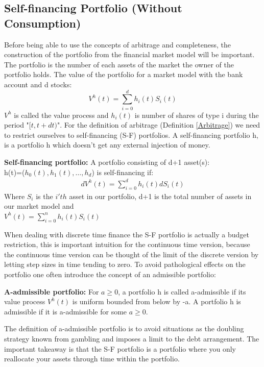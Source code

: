 \subsection{Self-financing Portfolio (Without Consumption)}
Before being able to use the concepts of arbitrage and completeness, the construction of the portfolio from the financial market model will be important. The portfolio is the number of each assets of the market the owner of the portfolio holds. The value of the portfolio for a market model with the bank account and d stocks:
\begin{equation*}
V^h(t)=\sum_{i=0}^{d} h_{i}(t) S_i(t)
\end{equation*}
$V^h$ is called the value process and $h_i(t)$ is number of shares of type i during the period "$[t,t+dt)$". For the definition of arbitrage (Definition \ref{Arbitrage}) we need to restrict ourselves to self-financing (S-F) portfolios. A self-financing portfolio h, is a portfolio h which doesn't get any external injection of money.
\theoremstyle{definition}
\begin{definition}{\textbf{Self-financing portfolio: }}
A portfolio consisting of d+1 asset(s): \\
h(t)=($h_0(t),h_1(t), \dotsc, h_{d}$) is self-financing if:
\begin{equation}\label{SF}
\begin{split}
dV^{h}(t)=\sum_{i=0}^{d} h_{i}(t) dS_{i}(t)
\end{split}
\end{equation}
Where $S_{i}$ is the $i'th$ asset in our portfolio, d+1 is the total number of assets in our market model and\\
$V^{h}(t)=\sum_{i=0}^{n} h_{i}(t) S_{i}(t)$\\
\end{definition}
When dealing with discrete time finance the S-F portfolio is actually a budget restriction, this is important intuition for the continuous time version, because the continuous time version can be thought of the limit of the discrete version by letting step sizes in time tending to zero. To avoid pathological effects on the portfolio one often introduce the concept of an admissible portfolio:
\theoremstyle{definition}
\begin{definition}{\textbf{A-admissible portfolio: }}
For $a\geq 0$, a portfolio h is called a-admissible if its value process $V^h(t)$ is uniform bounded from below by -a. A portfolio h is admissible if it is a-admissible for some $a\geq 0$.
\end{definition}
The definition of a-admissible portfolio is to avoid situations as the doubling strategy known from gambling and imposes a limit to the debt arrangement. The important takeaway is that the S-F portfolio is a portfolio where you only reallocate your assets through time within the portfolio.

